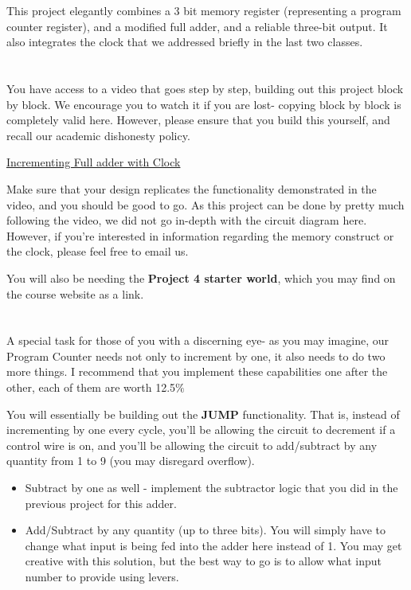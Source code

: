 \documentclass{article}
\begin{document}
This project elegantly combines a 3 bit memory register (representing a program counter register), and a modified full adder, and a reliable three-bit output.
It also integrates the clock that we addressed briefly in the last two classes. 

\section{\selectfont{Crafting is Believing}}

You have access to a video that goes step by step, building out this project block by block.
We encourage you to watch it if you are lost- copying block by block is completely valid here. 
However, please ensure that you build this yourself, and recall our academic dishonesty policy. 

\href{https://drive.google.com/file/d/1y5DlbOz2xEPjKfQTWWV6dcyvQly7oEPP/view}{Incrementing Full adder with Clock}

Make sure that your design replicates the functionality demonstrated in the video, and you should be good to go.
As this project can be done by pretty much following the video, we did not go in-depth with the circuit diagram here.
However, if you're interested in information regarding the memory construct or the clock, please feel free to email us.

You will also be needing the \textbf{Project 4 starter world}, which you may find on the course website as a link.

\section{\selectfont{25 $\%$ Extra Credit!}}

A special task for those of you with a discerning eye- as you may imagine, our Program Counter needs not only to increment by one, it also needs to do two more things.
I recommend that you implement these capabilities one after the other, each of them are worth 12.5$\%$

You will essentially be building out the \textbf{JUMP} functionality. That is, instead of incrementing by one every cycle, you'll be allowing the circuit to decrement if a control wire is on, and you'll be allowing the circuit to add/subtract by any quantity from 1 to 9 (you may disregard overflow). 

\begin{itemize}
  \item Subtract by one as well - implement the subtractor logic that you did in the previous project for this adder. 
  \item Add/Subtract by any quantity (up to three bits). You will simply have to change what input is being fed into the adder here instead of 1. You may get creative with this solution, but the best way to go is to allow what input number to provide using levers.
\end{itemize}
\end{document}
